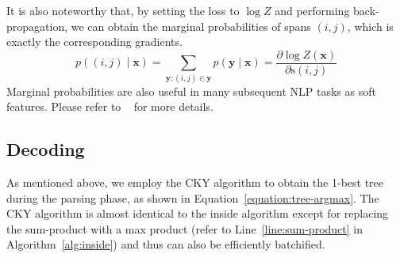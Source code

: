 \documentclass{article}
\begin{document}
It is also noteworthy that, by setting the loss to $\log Z$ and performing back-propagation, we can obtain the marginal probabilities of spans $(i,j)$, which is exactly the corresponding gradients.
\begin{equation} \label{equation:partial-derivative}
p((i, j)\mid\boldsymbol{x}) = \sum_{\boldsymbol{y}:(i,j) \in \boldsymbol{{y}}} p(\boldsymbol{y}\mid\boldsymbol{x}) = \frac{\partial \log Z(\boldsymbol{x})}{\partial \mathrm{s}(i, j)}
\end{equation}
Marginal probabilities are also useful in many subsequent NLP tasks as soft features.
Please refer to \citeauthor{eisner-2016-inside}~ for more details.

\subsection{Decoding}

As mentioned above, we employ the CKY algorithm to obtain the 1-best tree during the parsing phase, as shown in Equation~\ref{equation:tree-argmax}.
The CKY algorithm is almost identical to the inside algorithm except for replacing the sum-product with a max product (refer to Line~\ref{line:sum-product} in Algorithm~\ref{alg:inside}) and thus can also be efficiently batchified.
\end{document}
